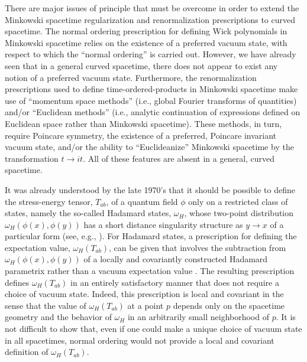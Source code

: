 There are major issues of principle that must be overcome in order to
extend the Minkowski spacetime regularization and renormalization
prescriptions to curved spacetime. The normal ordering prescription
for defining Wick polynomials in Minkowski spacetime relies on the
existence of a preferred vacuum state, with respect to which the
``normal ordering'' is carried out. However, we have already seen that
in a general curved spacetime, there does not appear to exist any
notion of a preferred vacuum state. Furthermore, the renormalization
prescriptions used to define time-ordered-products in Minkowski
spacetime make use of ``momentum space methods'' (i.e., global Fourier
transforms of quantities) and/or ``Euclidean methods'' (i.e., analytic
continuation of expressions defined on Euclidean space rather than
Minkowski spacetime). These methods, in turn, require Poincare
symmetry, the existence of a preferred, Poincare invariant vacuum
state, and/or the ability to ``Euclideanize'' Minkowski spacetime by
the transformation $t \rightarrow it$. All of these features are
absent in a general, curved spacetime.

It was already understood by the late 1970's that it should be
possible to define the stress-energy tensor, $T_{ab}$, of a quantum
field $\phi$ only on a restricted class of states, namely the
so-called Hadamard states, $\omega_H$, whose two-point distribution
$\omega_H (\phi(x), \phi(y))$ has a short distance singularity
structure as $y \rightarrow x$ of a particular form (see, e.g.,
\cite{w2}). For Hadamard states, a prescription for defining the
expectation value, $\omega_H (T_{ab})$, can be given that involves the
subtraction from $\omega_H (\phi(x), \phi(y))$ of a locally and
covariantly constructed Hadamard parametrix rather than a vacuum
expectation value \cite{w2}. The resulting prescription defines $\omega_H
(T_{ab})$ in an entirely satisfactory manner that does not require a
choice of vacuum state. Indeed, this prescription is local and
covariant in the sense that the value of $\omega_H (T_{ab})$ at a
point $p$ depends only on the spacetime geometry and the behavior of
$\omega_H$ in an arbitrarily small neighborhood of $p$. It is not
difficult to show that, even if one could make a unique choice of
vacuum state in all spacetimes, normal ordering would not provide a local
and covariant definition of $\omega_H (T_{ab})$.

